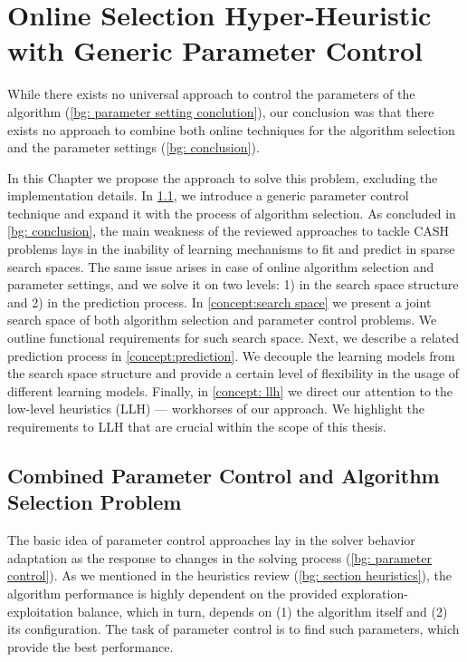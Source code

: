 \chapter{Online Selection Hyper-Heuristic with Generic Parameter Control}\label{Concept description}
While there exists no universal approach to control the parameters of the algorithm (\cref{bg: parameter setting conclution}), our conclusion was that there exists no approach to combine both online techniques for the algorithm selection and the parameter settings (\cref{bg: conclusion}). 

In this Chapter we propose the approach to solve this problem, excluding the implementation details. In \cref{concept:parameter control}, we introduce a generic parameter control technique and expand it with the process of algorithm selection. As concluded in \cref{bg: conclusion}, the main weakness of the reviewed approaches to tackle CASH problems lays in the inability of learning mechanisms to fit and predict in sparse search spaces. The same issue arises in case of online algorithm selection and parameter settings, and we solve it on two levels: 1) in the search space structure and 2) in the prediction process. In \cref{concept:search space} we present a joint search space of both algorithm selection and parameter control problems. We outline functional requirements for such search space. Next, we describe a related prediction process in \cref{concept:prediction}. We decouple the learning models from the search space structure and provide a certain level of flexibility in the usage of different learning models.
Finally, in \cref{concept: llh} we direct our attention to the low-level heuristics (LLH) — workhorses of our approach. We highlight the requirements to LLH that are crucial within the scope of this thesis.


\section{Combined Parameter Control and Algorithm Selection Problem}\label{concept:parameter control}
The basic idea of parameter control approaches lay in the solver behavior adaptation as the response to changes in the solving process (\cref{bg: parameter control}). As we mentioned in the heuristics review (\cref{bg: section heuristics}), the algorithm performance is highly dependent on the provided exploration-exploitation balance, which in turn, depends on (1) the algorithm itself and (2) its configuration. The task of parameter control is to find such parameters, which provide the best performance.

